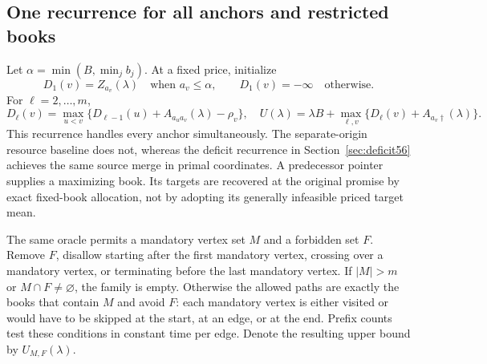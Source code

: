\documentclass[11pt,letterpaper]{article}
\theoremstyle{definition}\newtheorem{remark}[theorem]{Remark}
\begin{document}
\subsection{One recurrence for all anchors and restricted books}
Let $\alpha=\min(B,\min_jb_j)$. At a fixed price, initialize
\[
 D_1(v)=Z_{a_v}(\lambda)\quad\text{when }a_v\leq\alpha,
 \qquad D_1(v)=-\infty\quad\text{otherwise}.
\]
For $\ell=2,\ldots,m$,
\begin{equation}\label{eq:pricedDP54}
 D_\ell(v)=\max_{u<v}\{D_{\ell-1}(u)+A_{a_u a_v}(\lambda)-\rho_v\},
 \quad
 U(\lambda)=\lambda B+\max_{\ell,v}\{D_\ell(v)+A_{a_v\dagger}(\lambda)\}.
\end{equation}
This recurrence handles every anchor simultaneously. The separate-origin resource baseline does not, whereas the deficit recurrence in Section~\ref{sec:deficit56} achieves the same source merge in primal coordinates. A predecessor pointer supplies a maximizing book. Its targets are recovered at the original promise by exact fixed-book allocation, not by adopting its generally infeasible priced target mean.

The same oracle permits a mandatory vertex set $M$ and a forbidden set $F$. Remove $F$, disallow starting after the first mandatory vertex, crossing over a mandatory vertex, or terminating before the last mandatory vertex. If $|M|>m$ or $M\cap F\ne\varnothing$, the family is empty. Otherwise the allowed paths are exactly the books that contain $M$ and avoid $F$: each mandatory vertex is either visited or would have to be skipped at the start, at an edge, or at the end. Prefix counts test these conditions in constant time per edge. Denote the resulting upper bound by $U_{M,F}(\lambda)$.
\end{document}

